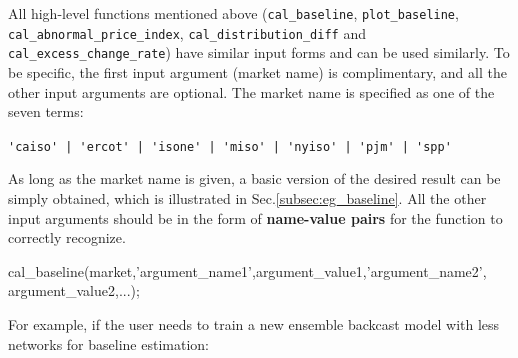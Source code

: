 \documentclass[10pt]{article}
\numberwithin{equation}{section}
\numberwithin{table}{section}
\numberwithin{figure}{section}
\begin{document}
All high-level functions mentioned above (\verb!cal_baseline!, \verb!plot_baseline!, \verb!cal_abnormal_price_index!, \verb!cal_distribution_diff! and \verb!cal_excess_change_rate!) have similar input forms and can be used similarly. To be specific, the first input argument (market name) is complimentary, and all the other input arguments are optional. The market name is specified as one of the seven terms:

\begin{center}
  \verb!'caiso' | 'ercot' | 'isone' | 'miso' | 'nyiso' | 'pjm' | 'spp'!
\end{center}

As long as the market name is given, a basic version of the desired result can be simply obtained, which is illustrated in Sec.\ref{subsec:eg_baseline}. All the other input arguments should be in the form of \textbf{name-value pairs} for the function to correctly recognize.

\begin{Code}
cal_baseline(market,'argument_name1',argument_value1,'argument_name2',
argument_value2,...);
\end{Code}

For example, if the user needs to train a new ensemble backcast model with less networks for baseline estimation:

\end{document}
